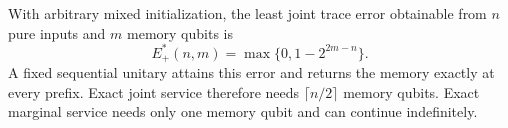 \begin{theorem}\label{thm:forwardoptimal}
With arbitrary mixed initialization, the least joint trace error obtainable from $n$ pure inputs and $m$ memory qubits is
\begin{equation}
 E_+^*(n,m)=\max\{0,1-2^{2m-n}\}.
 \label{eq:forwarderror}
\end{equation}
A fixed sequential unitary attains this error and returns the memory exactly at every prefix. Exact joint service therefore needs $\lceil n/2\rceil$ memory qubits. Exact marginal service needs only one memory qubit and can continue indefinitely.
\end{theorem}
